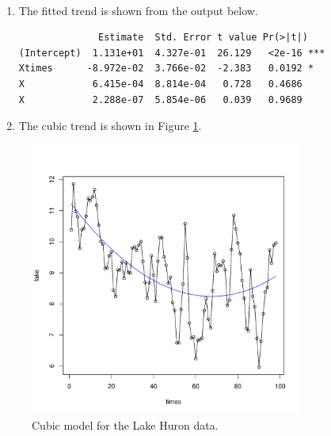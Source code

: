 \documentclass[12pt]{article}
\newenvironment{solution}[2][Solution]{\begin{trivlist}
\item[\hskip \labelsep {\bfseries #1}]}{\end{trivlist}}
\begin{document}
\begin{solution}{}
$ $
\begin{enumerate}[label=(\alph*)]
    \item The fitted trend is shown from the output below.
    \begin{lstlisting}
              Estimate  Std. Error t value Pr(>|t|)
(Intercept)  1.131e+01  4.327e-01  26.129   <2e-16 ***
Xtimes      -8.972e-02  3.766e-02  -2.383   0.0192 *
X            6.415e-04  8.814e-04   0.728   0.4686
X            2.288e-07  5.854e-06   0.039   0.9689
    \end{lstlisting}
    \item The cubic trend is shown in Figure \ref{fig:cubic_fit}.
\end{enumerate}

\begin{figure}[h]
    \vspace*{-1cm}
    \centering
    \includegraphics[width=0.8\textwidth]{figs/problem_9/cubic_fit.pdf}
    \vspace*{-0.5cm}
    \caption{Cubic model for the Lake Huron data.}
    \label{fig:cubic_fit}
\end{figure}


\end{solution}
\end{document}
